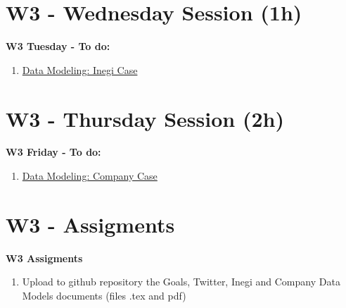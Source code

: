 \documentclass{beamer}
\begin{document}
\section{W3 - Wednesday Session (1h) }

\begin{frame}

\textbf{W3 Tuesday - To do:}

\begin{enumerate}
\item
	\href{https://github.com/adsoftsito/tdd/blob/master/w3/helloworld.tex}{Data Modeling: Inegi Case} 


\end{enumerate} 

\end{frame}

\section{W3 - Thursday Session (2h) }

\begin{frame}

\textbf{W3 Friday - To do:}

\begin{enumerate}
\item
	\href{https://github.com/adsoftsito/tdd/blob/master/w3/helloworld.tex}{Data Modeling: Company Case} 
\end{enumerate} 


\end{frame}



\section{W3 - Assigments }

\begin{frame}


\textbf{W3 Assigments}


\begin{enumerate}
\item
	 
	Upload to github repository the Goals, Twitter, Inegi and Company Data Models documents (files .tex and pdf)

\end{enumerate} 


\end{frame}
\end{document}
